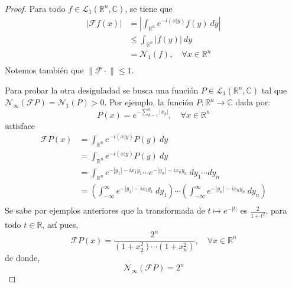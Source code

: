 \documentclass[12pt]{report}
\theoremstyle{largebreak}
\renewcommand{\leq}{\ensuremath{\leqslant}}
\newcommand\abs[1]{\ensuremath{\left|#1\right|}}
\newcommand\cf[3]{\ensuremath{#1:#2\rightarrow#3}}
\newcommand\norm[1]{\ensuremath{\|#1\|}}
\newcommand\pint[2]{\ensuremath{\left(#1\big| #2\right)}}
\newcommand{\N}[2]{\ensuremath{\mathcal{N}_{#1}\left(#2\right)}}
\newcommand{\fou}[1]{\ensuremath{\mathcal{F}#1}}
\begin{document}
    \begin{proof}
        Para todo $f\in\mathcal{L}_1(\mathbb{R}^n,\mathbb{C})$, se tiene que
        \begin{equation*}
            \begin{split}
                \abs{\fou{f}(x)}&=\abs{\int_{\mathbb{R}^n}e^{ -i\pint{x}{y}}f(y)\:dy}\\
                &\leq\int_{\mathbb{R}^n}\abs{f(y)}\:dy\\
                &=\N{1}{f},\quad\forall x\in\mathbb{R}^n \\
            \end{split}
        \end{equation*}
        Notemos también que $\norm{\fou{\cdot}}\leq1$.

        Para probar la otra desiguladad se busca una función $P\in\mathcal{L}_1(\mathbb{R}^n,\mathbb{C})$ tal que $\N{\infty}{\fou{P}}=\N{1}{P}>0$. Por ejemplo, la función $\cf{P}{\mathbb{R}^n}{\mathbb{C}}$ dada por:
        \begin{equation*}
            P(x)=e^{ -\sum_{ k=1}^n\abs{x_k}},\quad\forall x\in\mathbb{R}^n
        \end{equation*}
        satisface
        \begin{equation*}
            \begin{split}
                \fou{P}(x)&=\int_{\mathbb{R}^n}e^{ -i\pint{x}{y}}P(y)\:dy\\
                &=\int_{\mathbb{R}^n}e^{ -i\pint{x}{y}}P(y)\:dy\\
                &=\int_{\mathbb{R}^n}e^{ -\abs{y_1}-ix_1y_1}\cdots e^{ -\abs{y_n}-ix_ny_n}\:dy_1\cdots dy_n\\
                &=\left(\int_{-\infty}^{\infty}e^{ -\abs{y_1}-ix_1y_1}\:dy_1\right)\cdots\left(\int_{-\infty}^{\infty}e^{ -\abs{y_n}-ix_ny_n}\:dy_n\right)\\
            \end{split}
        \end{equation*}
        Se sabe por ejemplos anteriores que la transformada de $t\mapsto e^{-\abs{t}}$ es $\frac{2}{1+t^2}$, para todo $t\in\mathbb{R}$, así pues,
        \begin{equation*}
            \fou{P}(x)=\frac{2^n}{(1+x_2^2)\cdots(1+x_n^2)},\quad\forall x\in\mathbb{R}^n
        \end{equation*}
        de donde,
        \begin{equation*}
            \N{\infty}{\fou{P}}=2^n
        \end{equation*}

\end{proof}
\end{document}
